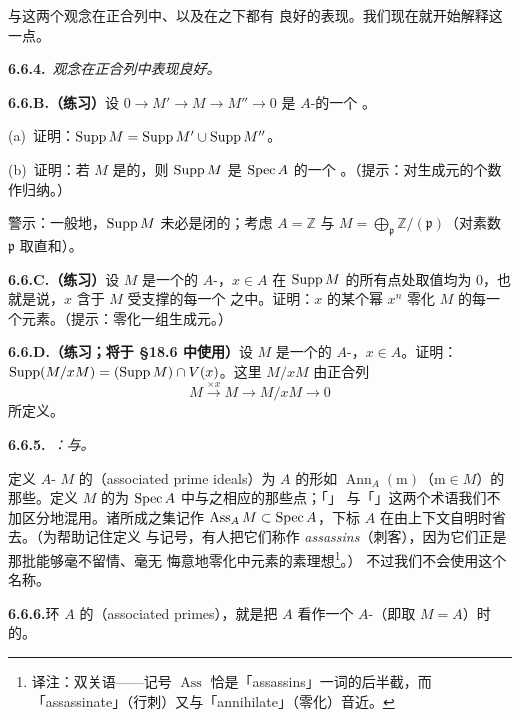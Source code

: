 \trSupport{}与\trAssociatedPoint{}这两个观念在正合列中、以及在\trLocalization{}之下都有
良好的表现。我们现在就开始解释这一点。

\textbf{6.6.4.}\ \emph{\trSupport{}观念在正合列中表现良好。}

\textbf{6.6.B.（练习）}\quad 设 $0\to M'\to M\to M''\to 0$ 是 $A$-\trModule{}的一个%
\trShortExactSequence。

(a)~证明：$\operatorname{Supp} M=\operatorname{Supp} M'\cup\operatorname{Supp} M''$。

(b)~证明：若 $M$ 是\trFinitelyGenerated{}的\trModule，则 $\operatorname{Supp} M$ 是 $\operatorname{Spec} A$ 的一个%
\trClosedSubset。（提示：对生成元的个数作归纳。）

警示：一般地，$\operatorname{Supp} M$ 未必是闭的；考虑 $A=\mathbb{Z}$ 与
$M=\bigoplus_{\mathfrak{p}}\mathbb{Z}/(\mathfrak{p})$（对素数 $\mathfrak{p}$ 取直和）。

\textbf{6.6.C.（练习）}\quad 设 $M$ 是一个\trFinitelyGenerated{}的 $A$-\trModule，$x\in A$
在 $\operatorname{Supp} M$ 的所有点处取值均为 $0$，也就是说，$x$ 含于 $M$ 受支撑的每一个\trPrimeIdeal{}
之中。证明：$x$ 的某个幂 $x^n$ 零化 $M$ 的每一个元素。（提示：零化一组生成元。）

\textbf{6.6.D.（练习；将于 \S18.6 中使用）}\quad 设 $M$ 是一个\trFinitelyGenerated{}的
$A$-\trModule，$x\in A$。证明：$\operatorname{Supp}(M/xM)=(\operatorname{Supp} M)\cap V(x)$。这里 $M/xM$ 由正合列
\[
M\xrightarrow{\times x}M\longrightarrow M/xM\longrightarrow 0
\]
所定义。

\textbf{6.6.5.}\ \emph{\trhDefinition{}：\trAssociatedPoint{}与\trAssociatedPrimeIdeal{}。}

定义 $A$-\trModule{} $M$ 的\textbf{\trAssociatedPrimeIdeal{}}（associated prime ideals）为 $A$ 的形如
$\operatorname{Ann}_A(\mathrm{m})$（$\mathrm{m}\in M$）的那些\emph{\trPrimeIdeal}。定义
$M$ 的\textbf{\trAssociatedPoint}为 $\operatorname{Spec} A$ 中与之相应的那些点；「\trAssociatedPoint」%
与「\trAssociatedPrimeIdeal{}」这两个术语我们不加区分地混用。诸\trAssociatedPoint{}所成之集记作
$\operatorname{Ass}_A M\subset\operatorname{Spec} A$，下标 $A$ 在由上下文自明时省去。（为帮助记住定义
与记号，有人把它们称作 \emph{assassins}（刺客），因为它们正是那批能够毫不留情、毫无
悔意地零化\trModule{}中元素的素理想\footnote{译注：双关语——记号 $\operatorname{Ass}$
恰是「assassins」一词的后半截，而「assassinate」（行刺）又与「annihilate」（零化）音近。}。）
不过我们不会使用这个名称。

\textbf{6.6.6.}\quad 环 $A$ 的\textbf{\trAssociatedPrimeIdeal{}}（associated primes），就是把 $A$ 看作一个
$A$-\trModule{}（即取 $M=A$）时的\trAssociatedPrimeIdeal{}。

